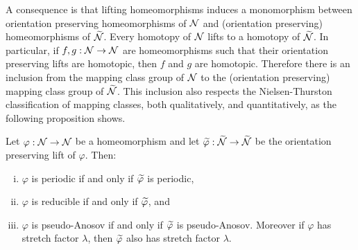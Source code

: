 A consequence is that lifting homeomorphisms induces a monomorphism between orientation preserving homeomorphisms of $\mathcal{N}$ and (orientation preserving) homeomorphisms of $\widetilde{\mathcal{N}}$.
Every homotopy of $\mathcal{N}$ lifts to a homotopy of $\widetilde{\mathcal{N}}$.
In particular, if $f,g:\mathcal{N}\to\mathcal{N}$ are homeomorphisms such that their orientation preserving lifts are homotopic, then $f$ and $g$ are homotopic.
Therefore there is an inclusion from the mapping class group of $\mathcal{N}$ to the (orientation preserving) mapping class group of $\widetilde{\mathcal{N}}$.
This inclusion also respects the Nielsen-Thurston classification of mapping classes, both qualitatively, and quantitatively, as the following proposition shows.
\begin{prop}
  \label{prop:2}
  Let $\varphi:\mathcal{N}\rightarrow\mathcal{N}$ be a homeomorphism and let $\widetilde{\varphi}:\widetilde{\mathcal{N}}\rightarrow\widetilde{\mathcal{N}}$ be the orientation preserving lift of $\varphi$.  Then:
  \begin{enumerate}[(i)]
  \item $\varphi$ is periodic if and only if $\widetilde{\varphi}$ is periodic,
  \item $\varphi$ is reducible if and only if $\widetilde{\varphi}$, and
  \item $\varphi$ is pseudo-Anosov if and only if $\widetilde{\varphi}$ is pseudo-Anosov.  Moreover if $\varphi$ has stretch factor $\lambda$, then $\widetilde{\varphi}$ also has stretch factor $\lambda$.
  \end{enumerate}
\end{prop}
